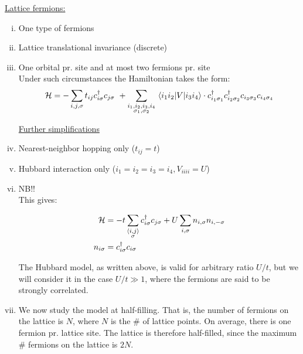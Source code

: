 \underline{Lattice fermions:}
\begin{enumerate}[i)]
    \item One type of fermions
    \item Lattice translational invariance (discrete)
    \item One orbital pr. site and at most two fermions pr. site \\

Under such circumstances the Hamiltonian takes the form:
\begin{equation}
    \mathcal{H} = - \sum_{i, j, \sigma} t_{ij} c_{i\sigma}^\dagger c_{j\sigma} \ + \sum_{\substack{i_1, i_2, i_3, i_4 \\ \sigma_1, \sigma_2}} \mel{i_1 i_2}{V}{i_3 i_4} \cdot c_{i_1\sigma_1}^\dagger c_{i_2\sigma_2}^\dagger c_{i_3\sigma_3} c_{i_4\sigma_4}
\end{equation}

\hspace{-0.5cm} \underline{Further simplifications}

\item Nearest-neighbor hopping only ($t_{ij} = t$)

\item Hubbard interaction only ($i_1 = i_2 = i_3 = i_4, V_{iiii} = U$)

\item {} NB!! \\

This gives:

\begin{align}
    \mathcal{H} &= -t \sum_{\substack{\langle i,j \rangle \\ \sigma}} c_{i\sigma}^\dagger c_{j\sigma} + U \sum_{i, \sigma} n_{i, \sigma} n_{i, -\sigma} \\
    n_{i\sigma} &= c_{i\sigma}^\dagger c_{i\sigma}
\end{align}

The Hubbard model, as written above, is valid for arbitrary ratio $U/t$, but we will consider it in the case $U/t \gg 1 $, where the fermions are said to be strongly correlated.

\item We now study the model at half-filling. That is, the number of fermions on the lattice is $N$, where $N$ is the \# of lattice points. On average, there is one fermion pr. lattice site. The lattice is therefore half-filled, since the maximum \# fermions on the lattice is $2N$. \\
\end{enumerate}


